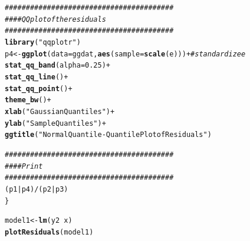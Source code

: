 \documentclass{article}\usepackage[]{graphicx}\usepackage[]{color}
\makeatletter
\newcommand{\hlnum}[1]{\textcolor[rgb]{0.686,0.059,0.569}{#1}}%
\newcommand{\hlstr}[1]{\textcolor[rgb]{0.192,0.494,0.8}{#1}}%
\newcommand{\hlcom}[1]{\textcolor[rgb]{0.678,0.584,0.686}{\textit{#1}}}%
\newcommand{\hlopt}[1]{\textcolor[rgb]{0,0,0}{#1}}%
\newcommand{\hlstd}[1]{\textcolor[rgb]{0.345,0.345,0.345}{#1}}%
\newcommand{\hlkwb}[1]{\textcolor[rgb]{0.69,0.353,0.396}{#1}}%
\newcommand{\hlkwc}[1]{\textcolor[rgb]{0.333,0.667,0.333}{#1}}%
\newcommand{\hlkwd}[1]{\textcolor[rgb]{0.737,0.353,0.396}{\textbf{#1}}}%
\newenvironment{kframe}{%
 \def\at@end@of@kframe{}%
 \ifinner\ifhmode%
  \def\at@end@of@kframe{\end{minipage}}%
  \begin{minipage}{\columnwidth}%
 \fi\fi%
 \def\FrameCommand##1{\hskip\@totalleftmargin \hskip-\fboxsep
 \colorbox{shadecolor}{##1}\hskip-\fboxsep
     \hskip-\linewidth \hskip-\@totalleftmargin \hskip\columnwidth}%
 \MakeFramed {\advance\hsize-\width
   \@totalleftmargin\z@ \linewidth\hsize
   \@setminipage}}%
 {\par\unskip\endMakeFramed%
 \at@end@of@kframe}
\newenvironment{knitrout}{}{} %
\makeatother
\begin{document}
\begin{enumerate}
\begin{enumerate}
\begin{knitrout}
\begin{kframe}
\begin{alltt}
  \hlcom{########################################}
  \hlcom{####  QQplot of the residuals}
  \hlcom{########################################}
  \hlkwd{library}\hlstd{(}\hlstr{"qqplotr"}\hlstd{)}
  \hlstd{p4}\hlkwb{<-}\hlkwd{ggplot}\hlstd{(}\hlkwc{data}\hlstd{=ggdat,}\hlkwd{aes}\hlstd{(}\hlkwc{sample}\hlstd{=}\hlkwd{scale}\hlstd{(e)))}\hlopt{+} \hlcom{#standardize e}
    \hlkwd{stat_qq_band}\hlstd{(}\hlkwc{alpha}\hlstd{=}\hlnum{0.25}\hlstd{)} \hlopt{+}
    \hlkwd{stat_qq_line}\hlstd{()} \hlopt{+}
    \hlkwd{stat_qq_point}\hlstd{()} \hlopt{+}
    \hlkwd{theme_bw}\hlstd{()}\hlopt{+}
    \hlkwd{xlab}\hlstd{(}\hlstr{"Gaussian Quantiles"}\hlstd{)}\hlopt{+}
    \hlkwd{ylab}\hlstd{(}\hlstr{"Sample Quantiles"}\hlstd{)}\hlopt{+}
    \hlkwd{ggtitle}\hlstd{(}\hlstr{"Normal Quantile-Quantile Plot of Residuals"}\hlstd{)}


  \hlcom{########################################}
  \hlcom{####  Print}
  \hlcom{########################################}
  \hlstd{(p1}\hlopt{|}\hlstd{p4)}\hlopt{/}\hlstd{(p2}\hlopt{|}\hlstd{p3)}
\hlstd{\}}
\end{alltt}
\end{kframe}
\end{knitrout}

\begin{knitrout}
\color{fgcolor}\begin{kframe}
\begin{alltt}
\hlstd{model1} \hlkwb{<-} \hlkwd{lm}\hlstd{(y2}\hlopt{~}\hlstd{x)}
\hlkwd{plotResiduals}\hlstd{(model1)}
\end{alltt}


{\ttfamily\noindent\itshape\color{messagecolor}{\#\# \\\#\# Attaching package: 'qqplotr'}}

{\ttfamily\noindent\itshape\color{messagecolor}{\#\# The following objects are masked from 'package:ggplot2':\\\#\# \\\#\# \ \ \ \ stat\_qq\_line, StatQqLine}}


\end{kframe}
\end{knitrout}
\end{enumerate}
\end{enumerate}
\end{document}
